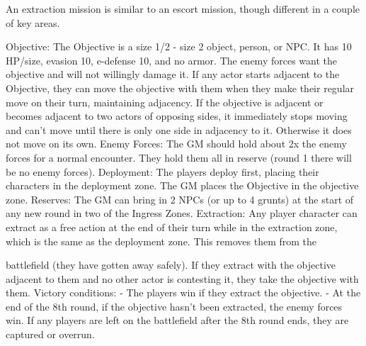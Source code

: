                                                                      An extraction mission is similar to an escort
                                                                     mission, though different in a couple of key
                                                                     areas.

                                                                     Objective: The Objective is a size 1/2 - size
                                                                     2 object, person, or NPC. It has 10 HP/size,
                                                                     evasion 10, e-defense 10, and no armor.
                                                                     The enemy forces want the objective and
                                                                     will not willingly damage it. If any actor starts
                                                                     adjacent to the Objective, they can move the
                                                                     objective with them when they make their
                                                                     regular move on their turn, maintaining
                                                                     adjacency. If the objective is adjacent or
                                                                     becomes adjacent to two actors of opposing
                                                                     sides, it immediately stops moving and can’t
                                                                     move until there is only one side in
                                                                     adjacency to it. Otherwise it does not move
                                                                    on its own.
Enemy Forces: The GM should hold about 2x the enemy forces for a normal encounter. They
hold them all in reserve (round 1 there will be no enemy forces).
Deployment: The players deploy first, placing their characters in the deployment zone. The GM
places the Objective in the objective zone.
Reserves: The GM can bring in 2 NPCs (or up to 4 grunts) at the start of any new round in two of
the Ingress Zones.
Extraction: Any player character can extract as a free action at the end of their turn while in the
extraction zone, which is the same as the deployment zone. This removes them from the




battlefield (they have gotten away safely). If they extract with the objective adjacent to them and
no other actor is contesting it, they take the objective with them.
Victory conditions:
         - The players win if they extract the objective.
         - At the end of the 8th round, if the objective hasn’t been extracted, the enemy forces win.
         If any players are left on the battlefield after the 8th round ends, they are captured or
        overrun.



